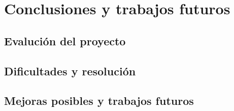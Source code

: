 \chapter{Conclusiones y trabajos futuros}\label{cap:conclusiones}

\section{Evalución del proyecto}


\section{Dificultades y resolución}

\section{Mejoras posibles y trabajos futuros}
